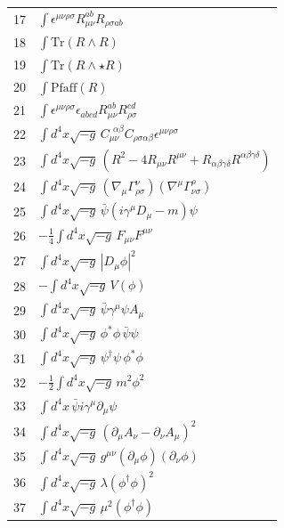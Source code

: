 \documentclass[11pt,a4paper]{article}
\begin{document}
\begin{longtable}{r p{}}
	17 & \(\displaystyle \int \epsilon^{\mu\nu\rho\sigma}R_{\mu\nu}^{ab}R_{\rho\sigma ab}\) \\
	18 & \(\displaystyle \int \mathrm{Tr}(R\wedge R)\) \\
	19 & \(\displaystyle \int \mathrm{Tr}(R\wedge\star R)\) \\
	20 & \(\displaystyle \int \mathrm{Pfaff}(R)\) \\
	21 & \(\displaystyle \int \epsilon^{\mu\nu\rho\sigma}\epsilon_{abcd}R_{\mu\nu}^{ab}R_{\rho\sigma}^{cd}\) \\
	22 & \(\displaystyle \int d^4x\sqrt{-g}\,C_{\mu\nu}^{\ \ \alpha\beta}C_{\rho\sigma\alpha\beta}\epsilon^{\mu\nu\rho\sigma}\) \\
	23 & \(\displaystyle \int d^4x\sqrt{-g}\,(R^2 - 4R_{\mu\nu}R^{\mu\nu} + R_{\alpha\beta\gamma\delta}R^{\alpha\beta\gamma\delta})\) \\
	24 & \(\displaystyle \int d^4x\sqrt{-g}\,(\nabla_\mu\Gamma^{\nu}_{\rho\sigma})(\nabla^\mu\Gamma^{\rho}_{\nu\sigma})\) \\
	25 & \(\displaystyle \int d^4x\sqrt{-g}\,\bar\psi(i\gamma^\mu D_\mu - m)\psi\) \\
	26 & \(\displaystyle -\frac14\int d^4x\sqrt{-g}\,F_{\mu\nu}F^{\mu\nu}\) \\
	27 & \(\displaystyle \int d^4x\sqrt{-g}\,|D_\mu\phi|^2\) \\
	28 & \(\displaystyle -\int d^4x\sqrt{-g}\,V(\phi)\) \\
	29 & \(\displaystyle \int d^4x\sqrt{-g}\,\bar\psi\gamma^\mu\psi A_\mu\) \\
	30 & \(\displaystyle \int d^4x\sqrt{-g}\,\phi^*\phi\,\bar\psi\psi\) \\
	31 & \(\displaystyle \int d^4x\sqrt{-g}\,\psi^\dagger\psi\,\phi^*\phi\) \\
	32 & \(\displaystyle -\frac12\int d^4x\sqrt{-g}\,m^2\phi^2\) \\
	33 & \(\displaystyle \int d^4x\,\bar\psi i\gamma^\mu\partial_\mu\psi\) \\
	34 & \(\displaystyle \int d^4x\sqrt{-g}\,(\partial_\mu A_\nu - \partial_\nu A_\mu)^2\) \\
	35 & \(\displaystyle \int d^4x\sqrt{-g}\,g^{\mu\nu}(\partial_\mu\phi)(\partial_\nu\phi)\) \\
	36 & \(\displaystyle \int d^4x\sqrt{-g}\,\lambda(\phi^\dagger\phi)^2\) \\
	37 & \(\displaystyle \int d^4x\sqrt{-g}\,\mu^2(\phi^\dagger\phi)\) \\

\end{longtable}
\end{document}
